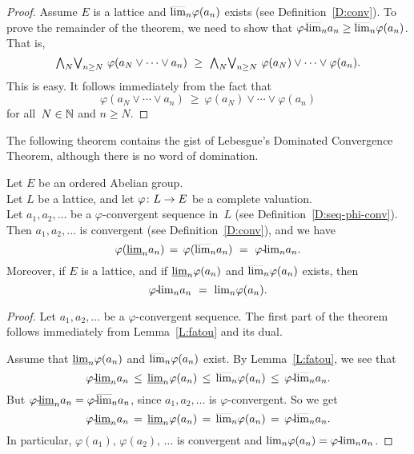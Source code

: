 \documentclass[main.tex]{subfiles}
\begin{document}
\begin{proof}
Assume $E$ is a lattice and $\smash{\overline{\lim}_{n}}\varphi(a_n)$ exists
(see Definition~\ref{D:conv}).
To prove the remainder of the theorem,
we need to show that 
${\varphi}\text{-}\!\smash{\overline{\lim}_{n}}a_n \geq \smash{\overline{\lim}_{n}}\varphi(a_n)$.
That is,
\begin{equation*}
\bw_N \bv_{n\geq N} \ \varphi(a_N \vee \dotsb \vee a_n)
\ \geq \ 
\bw_N \bv_{n\geq N} \ \varphi(a_N) \vee \dotsb \vee \varphi(a_n).
\end{equation*}
This is easy.  It follows immediately
from the fact that
\begin{equation*}
\varphi(a_N\vee \dotsb\vee a_n)
\ \geq\ \varphi(a_N)\vee \dotsb \vee \varphi(a_n)
\end{equation*}
for all~$N\in\mathbb{N}$ and $n\geq N$.
\end{proof}

%
%
\noindent
The following theorem contains the gist
of Lebesgue's Dominated Convergence Theorem,
although there is no word of domination.
\begin{thm}
\label{T:lebesgue}
Let $E$ be an ordered Abelian group.\\
Let $L$ be a lattice,
and let $\varphi\colon L \rightarrow E$ be a 
complete valuation.\\
Let $a_1,a_2,\dotsc$ be a $\varphi$-convergent
sequence in~$L$
(see Definition~\ref{D:seq-phi-conv}). \\
Then $a_1,a_2,\dotsc$ is convergent
(see Definition~\ref{D:conv}),
and we have
\begin{equation*}
\varphi(\llim{n}a_n) \,=\, \varphi(\ulim{n} a_n) 
\ =\ 
\plim\varphi{n} a_n.
\end{equation*}
Moreover,
if $E$ is a lattice,
and if $\smash{\underline{\lim}_{n}}\varphi(a_n)$ and $\smash{\overline{\lim}_{n}}\varphi(a_n)$ exists, 
then
\begin{equation*}
{\varphi}\text{-}\!{\lim}_{n}a_n \ =\ {\lim}_n \varphi(a_n).
\end{equation*}
\end{thm}
\begin{proof}
Let $a_1,a_2,\dotsc$ be a $\varphi$-convergent sequence.
The first part of the theorem follows immediately from Lemma~\ref{L:fatou}
and its dual.

Assume that $\smash{\underline{\lim}_{n}}\varphi(a_n)$ and $\smash{\overline{\lim}_{n}}\varphi(a_n)$ exist.
By Lemma~\ref{L:fatou}, we see that
\begin{equation*}
{\varphi}\text{-}\!\smash{\underline{\lim}_{n}}a_n \,\leq\,
\smash{\underline{\lim}_{n}}\varphi(a_n) \,\leq\,
\smash{\overline{\lim}_{n}}\varphi(a_n) \,\leq\,
{\varphi}\text{-}\!\smash{\overline{\lim}_{n}}a_n.
\end{equation*}
But ${\varphi}\text{-}\!\smash{\underline{\lim}_{n}}a_n = {\varphi}\text{-}\!\smash{\overline{\lim}_{n}}a_n$,
since $a_1,a_2,\dotsc$ is $\varphi$-convergent.
So we get 
\begin{equation*}
{\varphi}\text{-}\!\smash{\underline{\lim}_{n}}a_n \,=\,
\smash{\underline{\lim}_{n}}\varphi(a_n) \,=\,
\smash{\overline{\lim}_{n}}\varphi(a_n) \,=\,
{\varphi}\text{-}\!\smash{\overline{\lim}_{n}}a_n.
\end{equation*}
In particular,
$\varphi(a_1),\,\varphi(a_2),\,\dotsc$
is convergent and ${\lim}_n\varphi(a_n) = {\varphi}\text{-}\!{\lim}_{n}a_n$.
\end{proof}
\end{document}
